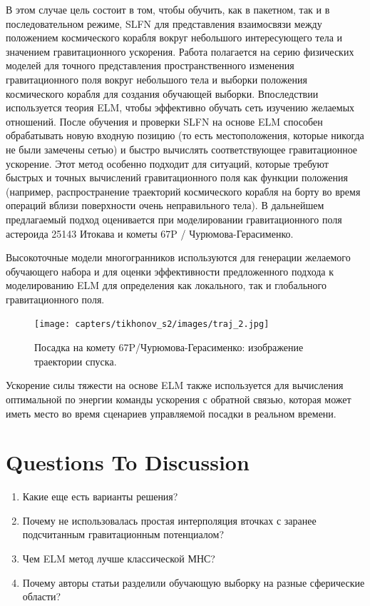 В этом случае цель состоит в том, чтобы обучить, как в пакетном, так и в последовательном режиме, SLFN для представления взаимосвязи между положением космического корабля вокруг небольшого интересующего тела и значением гравитационного ускорения.
Работа полагается на серию физических моделей для точного представления пространственного изменения гравитационного поля вокруг небольшого тела и выборки положения космического корабля для создания обучающей выборки.
Впоследствии используется теория ELM, чтобы эффективно обучать сеть изучению желаемых отношений. После обучения и проверки SLFN на основе ELM способен обрабатывать новую входную позицию (то есть местоположения, которые никогда не были замечены сетью) и быстро вычислять соответствующее гравитационное ускорение.
Этот метод особенно подходит для ситуаций, которые требуют быстрых и точных вычислений гравитационного поля как функции положения (например, распространение траекторий космического корабля на борту во время операций вблизи поверхности очень неправильного тела).
В дальнейшем предлагаемый подход оценивается при моделировании гравитационного поля астероида 25143 Итокава и кометы 67P / Чурюмова-Герасименко.

Высокоточные модели многогранников используются для генерации желаемого обучающего набора и для оценки эффективности предложенного подхода к моделированию ELM для определения как локального, так и глобального гравитационного поля.
\begin{figure}[h]
    \centering
    \texttt{[image: capters/tikhonov\_s2/images/traj\_2.jpg]}
    \caption{Посадка на комету 67P/Чурюмова-Герасименко: изображение траектории спуска.}
    \label{fg:1}
\end{figure}

Ускорение силы тяжести на основе ELM также используется для вычисления оптимальной по энергии команды ускорения с обратной связью, которая может иметь место во время сценариев управляемой посадки в реальном времени.
\section{Questions To Discussion}
\begin{enumerate}
    \item Какие еще есть варианты решения?
    \item Почему не использовалась простая интерполяция вточках с заранее подсчитанным гравитационным потенциалом?
    \item Чем ELM метод лучше классической МНС?
    \item Почему авторы статьи разделили обучающую выборку на разные сферические области?
\end{enumerate}